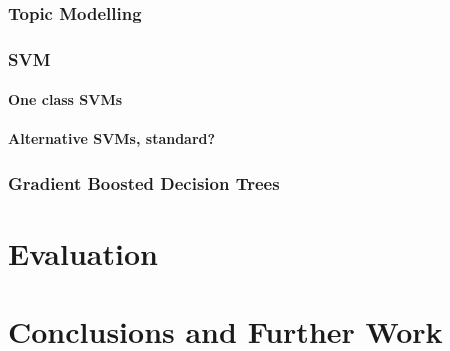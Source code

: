 \documentclass[bsc,frontabs,singlespacing,parskip]{infthesis}     %
\begin{document}
\subsection{Topic Modelling}
\subsection{SVM}
\subsubsection{One class SVMs}
\subsubsection{Alternative SVMs, standard?}
\subsection{Gradient Boosted Decision Trees}
\chapter{Evaluation}
\chapter{Conclusions and Further Work}




\end{document}
